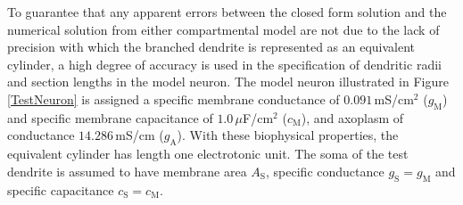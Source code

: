 
To guarantee that any apparent errors between the closed form
solution and the numerical solution from either compartmental
model are not due to the lack of precision with which the branched
dendrite is represented as an equivalent cylinder, a high degree
of accuracy is used in the specification of dendritic radii and
section lengths in the model neuron. The model neuron illustrated
in Figure \ref{TestNeuron} is assigned a specific membrane
conductance of $0.091\,$mS/cm$^2$ ($g_\mathrm{M}$) and specific
membrane capacitance of $1.0\,\mu$F/cm$^2$ ($c_\mathrm{M}$), and
axoplasm of conductance $14.286\,$mS/cm ($g_\mathrm{A}$). With
these biophysical properties, the equivalent cylinder has length
one electrotonic unit. The soma of the test dendrite is assumed to
have membrane area $A_\mathrm{S}$, specific conductance
$g_\mathrm{S}=g_\mathrm{M}$ and specific capacitance
$c_\mathrm{S}=c_\mathrm{M}$.

